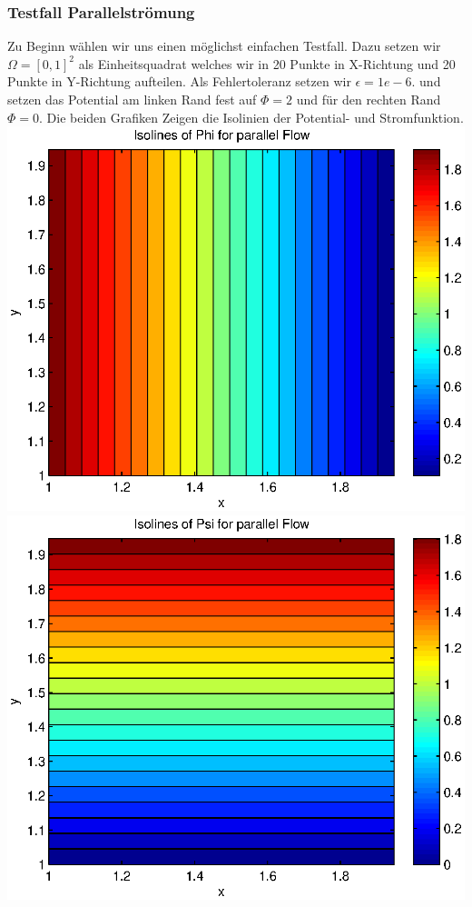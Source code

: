 \documentclass{article}
\begin{document}
\subsubsection{Testfall Parallelströmung} 
Zu Beginn wählen wir uns einen möglichst einfachen Testfall. Dazu setzen wir $\Omega =[0,1]^2$ als Einheitsquadrat welches 
wir in 20 Punkte in X-Richtung und 20 Punkte in Y-Richtung aufteilen. Als Fehlertoleranz setzen wir $\epsilon= 1e-6$.
und setzen das Potential am linken Rand fest auf $\Phi = 2$ und für den rechten Rand $\Phi = 0$.
Die beiden Grafiken Zeigen die Isolinien der Potential- und Stromfunktion.\\
\includegraphics[scale=0.5]{test/1parallel/phi.eps} 
\includegraphics[scale=0.5]{test/1parallel/psi.eps}  \\
\end{document}
